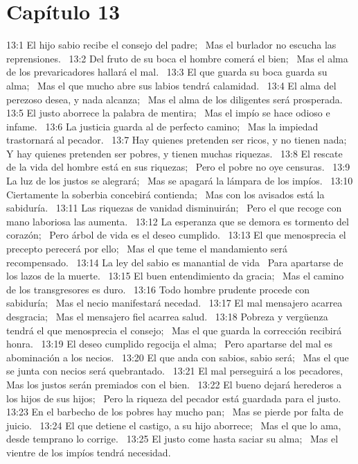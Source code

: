 \section*{Capítulo 13 }

13:1 El hijo sabio recibe el consejo del padre;  
Mas el burlador no escucha las reprensiones.  
13:2 Del fruto de su boca el hombre comerá el bien;  
Mas el alma de los prevaricadores hallará el mal.  
13:3 El que guarda su boca guarda su alma;  
Mas el que mucho abre sus labios tendrá calamidad.  
13:4 El alma del perezoso desea, y nada alcanza;  
Mas el alma de los diligentes será prosperada.  
13:5 El justo aborrece la palabra de mentira;  
Mas el impío se hace odioso e infame.  
13:6 La justicia guarda al de perfecto camino;  
Mas la impiedad trastornará al pecador.  
13:7 Hay quienes pretenden ser ricos, y no tienen nada;  
Y hay quienes pretenden ser pobres, y tienen muchas riquezas.  
13:8 El rescate de la vida del hombre está en sus riquezas;  
Pero el pobre no oye censuras.  
13:9 La luz de los justos se alegrará;  
Mas se apagará la lámpara de los impíos.  
13:10 Ciertamente la soberbia concebirá contienda;  
Mas con los avisados está la sabiduría.  
13:11 Las riquezas de vanidad disminuirán;  
Pero el que recoge con mano laboriosa las aumenta.  
13:12 La esperanza que se demora es tormento del corazón;  
Pero árbol de vida es el deseo cumplido.  
13:13 El que menosprecia el precepto perecerá por ello;  
Mas el que teme el mandamiento será recompensado.  
13:14 La ley del sabio es manantial de vida  
Para apartarse de los lazos de la muerte.  
13:15 El buen entendimiento da gracia;  
Mas el camino de los transgresores es duro.  
13:16 Todo hombre prudente procede con sabiduría;  
Mas el necio manifestará necedad.  
13:17 El mal mensajero acarrea desgracia;  
Mas el mensajero fiel acarrea salud.  
13:18 Pobreza y vergüenza tendrá el que menosprecia el consejo;  
Mas el que guarda la corrección recibirá honra.  
13:19 El deseo cumplido regocija el alma;  
Pero apartarse del mal es abominación a los necios.  
13:20 El que anda con sabios, sabio será;  
Mas el que se junta con necios será quebrantado.  
13:21 El mal perseguirá a los pecadores,  
Mas los justos serán premiados con el bien.  
13:22 El bueno dejará herederos a los hijos de sus hijos;  
Pero la riqueza del pecador está guardada para el justo.  
13:23 En el barbecho de los pobres hay mucho pan;  
Mas se pierde por falta de juicio.  
13:24 El que detiene el castigo, a su hijo aborrece;  
Mas el que lo ama, desde temprano lo corrige.  
13:25 El justo come hasta saciar su alma;  
Mas el vientre de los impíos tendrá necesidad.  
